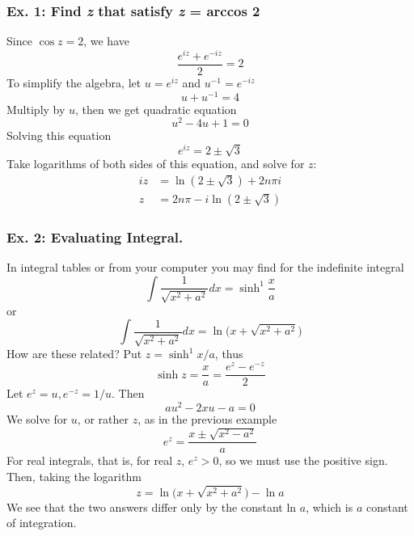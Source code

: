 \documentclass[../../../main.tex]{subfiles}
\begin{document}
\subsubsection{Ex. 1: Find \emph{z} that satisfy \emph{z} = arccos 2} Since $\cos z=2$, we have
\begin{equation*}
    \frac{e^{iz}+e^{-iz}}{2}=2
\end{equation*}
To simplify the algebra, let $u = e^{iz}$ and $ u^{-1}=e^{-iz}$
\begin{equation*}
    u+u^{-1}=4
\end{equation*}
Multiply by $u$, then we get quadratic equation
\begin{equation*}
    u^2-4u+1=0
\end{equation*} 
Solving this equation
\begin{equation*}
    e^{iz}=2\pm\sqrt{3}
\end{equation*}
Take logarithms of both sides of this equation, and solve for $z$:
\begin{align*}
    iz&=\ln (2\pm\sqrt{3})+2n\pi i\\
    z&=2n\pi -i\ln (2\pm\sqrt{3})
\end{align*}

\subsubsection{Ex. 2: Evaluating Integral.} In integral tables or from your computer you may find for the indefinite integral
\begin{equation*}
    \int \frac{1}{\sqrt{x^2+a^2}}dx    =\sinh^1\frac{x}{a}
\end{equation*}
or
\begin{equation*}
    \int \frac{1}{\sqrt{x^2+a^2}}dx    =\ln\big(x+\sqrt{x^2+a^2}\big)
\end{equation*}
How are these related? Put $z=\sinh^1 x/a$, thus
\begin{equation*}
    \sinh z=\frac{x}{a}=\frac{e^z-e^{-z}}{2}
\end{equation*}
Let $e^z = u, e^{-z} = 1/u$. Then
\begin{equation*}
    au^2 - 2xu - a = 0
\end{equation*}
We solve for $u$, or rather $z$, as in the previous example
\begin{equation*}
    e^z=\frac{x\pm\sqrt{x^2-a^2}}{a}
\end{equation*}
For real integrals, that is, for real $z$, $e^z > 0$, so we must use the positive sign. Then,
taking the logarithm
\begin{equation*}
    z=\ln\big(x+\sqrt{x^2+a^2}\big)-\ln a
\end{equation*}
We see that the two answers differ only by the constant ln $a$, which is $a$ constant of integration.
\end{document}
